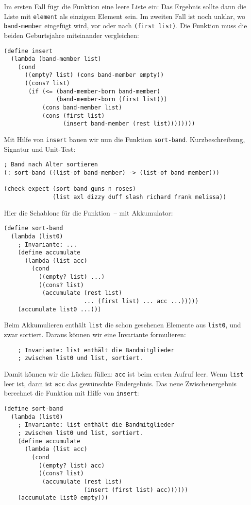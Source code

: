 %
Im ersten Fall fügt die Funktion eine leere Liste ein: Das Ergebnis
sollte dann die Liste mit \lstinline{element} als einzigem Element
sein.  Im zweiten Fall ist noch unklar, wo \lstinline{band-member}
eingefügt wird, vor oder nach \lstinline{(first list)}.  Die Funktion
muss die beiden Geburtsjahre miteinander vergleichen:
%
\begin{lstlisting}
(define insert
  (lambda (band-member list)
    (cond
      ((empty? list) (cons band-member empty))
      ((cons? list)
       (if (<= (band-member-born band-member)
               (band-member-born (first list)))
           (cons band-member list)
           (cons (first list)
                 (insert band-member (rest list))))))))
\end{lstlisting}
%
Mit Hilfe von \lstinline{insert} bauen wir nun die Funktion
\lstinline{sort-band}.  Kurzbeschreibung, Signatur und Unit-Test:
%
\begin{lstlisting}
; Band nach Alter sortieren
(: sort-band ((list-of band-member) -> (list-of band-member)))

(check-expect (sort-band guns-n-roses)
              (list axl dizzy duff slash richard frank melissa))
\end{lstlisting}
%
Hier die Schablone für die Funktion~-- mit Akkumulator:
%
\begin{lstlisting}
(define sort-band
  (lambda (list0)
    ; Invariante: ...
    (define accumulate     
      (lambda (list acc)
        (cond
          ((empty? list) ...)
          ((cons? list)
           (accumulate (rest list)
                       ... (first list) ... acc ...)))))
    (accumulate list0 ...)))
\end{lstlisting}
%
Beim Akkumulieren enthält \lstinline{list} die schon gesehenen
Elemente aus \lstinline{list0}, und zwar sortiert.  Daraus können wir
eine Invariante formulieren:
%
\begin{lstlisting}
    ; Invariante: list enthält die Bandmitglieder
    ; zwischen list0 und list, sortiert.
\end{lstlisting}
%
Damit können wir die Lücken füllen: \lstinline{acc} ist beim ersten
Aufruf leer.  Wenn \lstinline{list} leer ist, dann ist \lstinline{acc}
das gewünschte Endergebnis.  Das neue Zwischenergebnis berechnet die
Funktion mit Hilfe von \lstinline{insert}:
%
\begin{lstlisting}
(define sort-band
  (lambda (list0)
    ; Invariante: list enthält die Bandmitglieder
    ; zwischen list0 und list, sortiert.
    (define accumulate     
      (lambda (list acc)
        (cond
          ((empty? list) acc)
          ((cons? list)
           (accumulate (rest list)
                       (insert (first list) acc))))))
    (accumulate list0 empty)))
\end{lstlisting}
